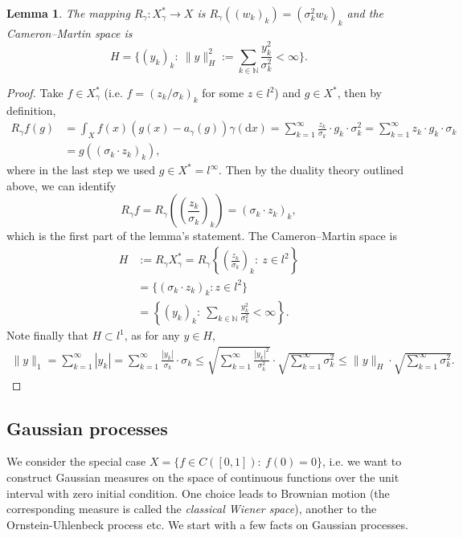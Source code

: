\documentclass{scrartcl}
\newtheorem{lemma}{Lemma}
\theoremstyle{definition}
\theoremstyle{remark}
\begin{document}
{\begin{lemma}
The mapping $R_\gamma : X_\gamma^*\to X$ is $R_\gamma ((w_k)_k) = (\sigma_k^2 w_k)_k$ and the Cameron--Martin space is \[H = \{(y_k)_k:~ \|y\|_H^2 := \sum_{k\in\mathbb N} \frac{y_k^2}{\sigma_k^2} < \infty\}.\]
\end{lemma}
\begin{proof}
Take $f\in X_\gamma^*$ (i.e. $f = (z_k/\sigma_k)_k$ for some $z\in l^2$) and $g\in X^*$, then by definition,
\begin{align*}
R_\gamma f(g) &= \int_X f(x) (g(x)-a_\gamma(g))\gamma(\mathrm d x) = \sum_{k=1}^\infty \frac{z_k}{\sigma_k}\cdot g_k \cdot \sigma_k^2 = \sum_{k=1}^\infty z_k\cdot g_k \cdot \sigma_k \\
&= g((\sigma_k\cdot z_k)_k),
\end{align*}
where in the last step we used $g\in X^* = l^\infty$. Then by the duality theory outlined above, we can identify
\[R_\gamma f = R_\gamma\left( \left(\frac{z_k}{\sigma_k}\right)_k\right) = (\sigma_k\cdot z_k)_k,\]
which is the first part of the lemma's statement. 
The Cameron--Martin space is
\begin{align*}
H &:= R_\gamma X_\gamma^* = R_\gamma\left\{\left(\frac{z_k}{\sigma_k}\right)_k:~ z\in l^2\right\}\\
&= \{(\sigma_k\cdot z_k)_k: z\in l^2\}\\
&=\left\{(y_k)_k:~ \sum_{k\in\mathbb N} \frac{y_k^2}{\sigma_k^2} < \infty\right\}.
\end{align*}
Note finally that $H\subset l^1$, as for any $y\in H$,
\begin{align*}
\|y\|_1 = \sum_{k=1}^\infty |y_k| = \sum_{k=1}^\infty \frac{|y_k|}{\sigma_k}\cdot \sigma_k \leq \sqrt{\sum_{k=1}^\infty \frac{|y_k|^2}{\sigma_k^2}}\cdot \sqrt{\sum_{k=1}^\infty {\sigma_k^2}} \leq \|y\|_H\cdot \sqrt{\sum_{k=1}^\infty {\sigma_k^2}}.
\end{align*}
\end{proof}
}
\subsection{Gaussian processes}
We consider the special case $X = \{f \in C([0,1]):~ f(0) = 0\}$, i.e. we want to construct Gaussian measures on the space of continuous functions over the unit interval with zero initial condition. One choice leads to Brownian motion (the corresponding measure is called the \textit{classical Wiener space}), another to the Ornstein-Uhlenbeck process etc. We start with a few facts on Gaussian processes.
\end{document}
